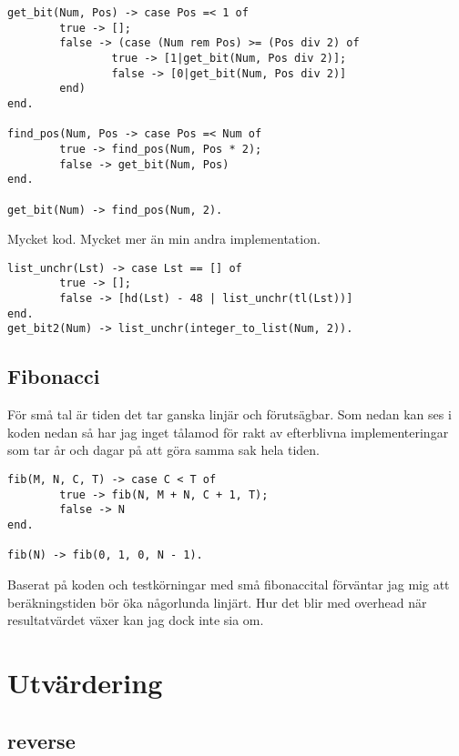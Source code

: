 \documentclass[a4paper, 11pt]{article}
\begin{document}
\begin{verbatim}
get_bit(Num, Pos) -> case Pos =< 1 of
        true -> [];
        false -> (case (Num rem Pos) >= (Pos div 2) of
                true -> [1|get_bit(Num, Pos div 2)];
                false -> [0|get_bit(Num, Pos div 2)]
        end)
end.

find_pos(Num, Pos -> case Pos =< Num of
        true -> find_pos(Num, Pos * 2);
        false -> get_bit(Num, Pos)
end.

get_bit(Num) -> find_pos(Num, 2).
\end{verbatim}

Mycket kod. Mycket mer än min andra implementation.

\begin{verbatim}
list_unchr(Lst) -> case Lst == [] of
        true -> [];
        false -> [hd(Lst) - 48 | list_unchr(tl(Lst))]
end.
get_bit2(Num) -> list_unchr(integer_to_list(Num, 2)).
\end{verbatim}

\subsection{Fibonacci}

För små tal är tiden det tar ganska linjär och förutsägbar. Som nedan kan ses i koden nedan så har jag inget tålamod för rakt av efterblivna implementeringar som tar år och dagar på att göra samma sak hela tiden.

\begin{verbatim}
fib(M, N, C, T) -> case C < T of
        true -> fib(N, M + N, C + 1, T);
        false -> N
end.

fib(N) -> fib(0, 1, 0, N - 1).
\end{verbatim}

Baserat på koden och testkörningar med små fibonaccital förväntar jag mig att beräkningstiden bör öka någorlunda linjärt. Hur det blir med overhead när resultatvärdet växer kan jag dock inte sia om.






\section{Utvärdering}

\subsection{reverse}
\end{document}
